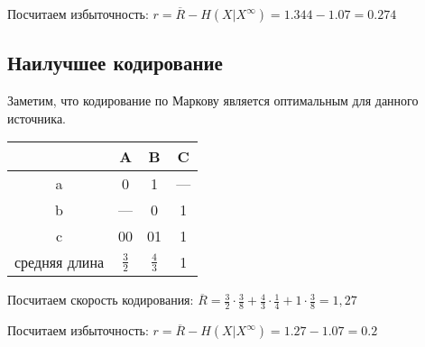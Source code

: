 Посчитаем избыточность: $ r = \overline{R} - H(X|X^{\infty}) = 1.344 - 1.07 = 0.274$

\subsection{Наилучшее кодирование}

Заметим, что кодирование по Маркову является оптимальным для данного источника. 


\begin{tabular}{|c|c|c|c|}
\hline
    & A & B & C\\
\hline
a & 0 & 1 & {---}\\
\hline
b & {---} & 0 & 1\\
\hline
c & 00 & 01 & 1\\
\hline
средняя длина & $\frac{3}{2}$ & $\frac{4}{3}$ & 1\\
\hline
\end{tabular}

Посчитаем скорость кодирования: $\overline{R} = \frac{3}{2} \cdot \frac{3}{8} + \frac{4}{3} \cdot \frac{1}{4} + 1 \cdot \frac{3}{8} = 1,27$

Посчитаем избыточность: $ r = \overline{R} - H(X|X^{\infty}) = 1.27 - 1.07 = 0.2$ 
